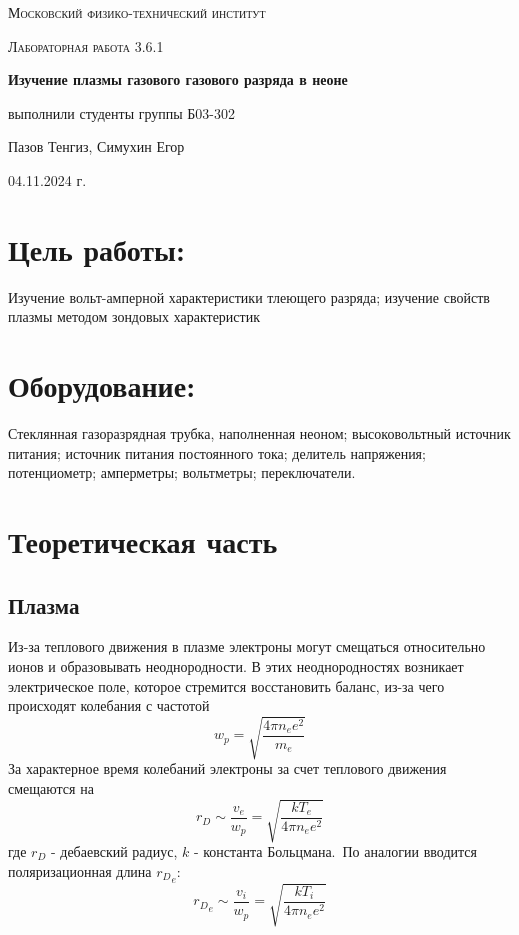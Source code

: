 \documentclass[a4paper,12pt]{article}
\begin{document}
\begin{titlepage}
  \centering
  {\scshape\LARGE Московский физико-технический институт \par}
  \vspace{10cm}
  {\scshape\Large Лабораторная работа 3.6.1 \par}
  \vspace{1cm}
  {\huge\bfseries Изучение плазмы газового газового разряда в неоне \par}
  \vspace{1cm}
  \vfill
\begin{flushright}
  {\large выполнили студенты группы Б03-302}\par
  \vspace{0.3cm}
  {\LARGE Пазов Тенгиз, Симухин Егор}

\end{flushright}
  \vfill
  04.11.2024 г.
\end{titlepage}

\large\section{Цель работы:}
\hspace{0.6cm} Изучение вольт-амперной характеристики тлеющего разряда; изучение свойств плазмы методом зондовых характеристик

\section{Оборудование:}
\hspace{0.6cm} Стеклянная газоразрядная трубка, наполненная неоном; высоковольтный источник питания; источник питания постоянного тока; делитель напряжения; потенциометр; амперметры; вольтметры; переключатели.

\section{Теоретическая часть}
    \subsection*{Плазма}


Из-за теплового движения в плазме электроны могут смещаться относительно ионов и образовывать неоднородности. В этих неоднородностях возникает электрическое поле, которое стремится восстановить баланс, из-за чего происходят колебания с частотой 
\begin{equation}
    w_p = \sqrt{\frac{4\pi n_e e^2}{m_e}}
\end{equation}
За характерное время колебаний электроны за счет теплового движения смещаются на
\begin{equation}
    r_D \sim \frac{v_e}{w_p} = \sqrt{\frac{kT_e}{4\pi n_e e^2}}
\end{equation}
где $r_D$ - дебаевский радиус, $k$ - константа Больцмана.\
По аналогии вводится поляризационная длина ${r_D}_e$:
\begin{equation}
    {r_D}_e \sim \frac{v_i}{w_p} = \sqrt{\frac{kT_i}{4\pi n_e e^2}}
\end{equation}
\end{document}
